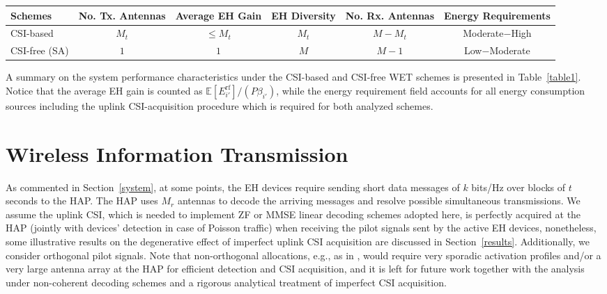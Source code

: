 \documentclass[10pt,journal,a4paper]{IEEEtran}
\begin{document}
%
	\begin{table*}[!t]
		\centering
		\caption{Main system performance characteristics under the considered CSI-based and CSI-free WET schemes}
%
		\begin{tabular}{lccccc}
			\toprule
			\textbf{Schemes} & \textbf{No. Tx. Antennas} &  \textbf{Average EH Gain} & \textbf{EH Diversity} & \textbf{No. Rx. Antennas} & \textbf{Energy Requirements} \\
			\midrule
			CSI-based  & $M_t$ & $\le M_t$ & $M_t$ & $M-M_t$ & Moderate$-$High\\ 
			CSI-free (SA)  & $1$  & $1$ &$M$ & $M-1$ & Low$-$Moderate\\		
			\bottomrule
		\end{tabular}\label{table1}
%
	\end{table*}
	
	A summary on the system performance characteristics under the CSI-based and CSI-free WET schemes is presented in Table~\ref{table1}. Notice that the average EH gain is counted as $\mathbb{E}[E^\mathrm{rf}_{i'}]/(P\beta_{i'})$, while the energy requirement field accounts for all energy consumption sources including the uplink CSI-acquisition procedure which is required for both analyzed schemes.
	\section{Wireless Information Transmission}\label{WIT}
	As commented in Section~\ref{system}, at some points, the EH devices require sending short data messages of $k$ bits/Hz over blocks of $t$ seconds to the HAP. The HAP uses $M_r$ antennas to decode the arriving messages and resolve possible simultaneous transmissions.   We assume the uplink CSI, which is needed to implement ZF or MMSE linear decoding schemes adopted here, is perfectly acquired  at the HAP (jointly with devices' detection in case of Poisson traffic) when receiving the pilot signals sent by the active EH devices, nonetheless, some illustrative results on the degenerative effect of imperfect uplink CSI acquisition are discussed in Section~\ref{results}.	
	Additionally, we consider orthogonal pilot signals.
	Note that non-orthogonal allocations, e.g., as in \cite{Shao.2020}, would require very sporadic activation profiles and/or a very large antenna array at the HAP for efficient detection and CSI acquisition, and it is left for future work together with the analysis under non-coherent decoding schemes and a rigorous analytical treatment of imperfect CSI acquisition.
	
\end{document}
